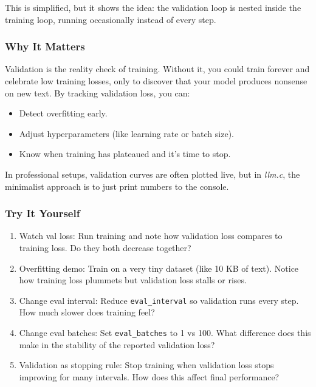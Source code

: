 \documentclass[
  letterpaper,
  DIV=11,
  numbers=noendperiod]{scrreprt}
\providecommand{\tightlist}{%
  \setlength{\itemsep}{0pt}\setlength{\parskip}{0pt}}
\begin{document}
This is simplified, but it shows the idea: the validation loop is nested
inside the training loop, running occasionally instead of every step.

\subsubsection{Why It Matters}\label{why-it-matters-4}

Validation is the reality check of training. Without it, you could train
forever and celebrate low training losses, only to discover that your
model produces nonsense on new text. By tracking validation loss, you
can:

\begin{itemize}
\tightlist
\item
  Detect overfitting early.
\item
  Adjust hyperparameters (like learning rate or batch size).
\item
  Know when training has plateaued and it's time to stop.
\end{itemize}

In professional setups, validation curves are often plotted live, but in
\emph{llm.c}, the minimalist approach is to just print numbers to the
console.

\subsubsection{Try It Yourself}\label{try-it-yourself-4}

\begin{enumerate}
\def\labelenumi{\arabic{enumi}.}
\tightlist
\item
  Watch val loss: Run training and note how validation loss compares to
  training loss. Do they both decrease together?
\item
  Overfitting demo: Train on a very tiny dataset (like 10 KB of text).
  Notice how training loss plummets but validation loss stalls or rises.
\item
  Change eval interval: Reduce \texttt{eval\_interval} so validation
  runs every step. How much slower does training feel?
\item
  Change eval batches: Set \texttt{eval\_batches} to 1 vs 100. What
  difference does this make in the stability of the reported validation
  loss?
\item
  Validation as stopping rule: Stop training when validation loss stops
  improving for many intervals. How does this affect final performance?
\end{enumerate}
\end{document}
